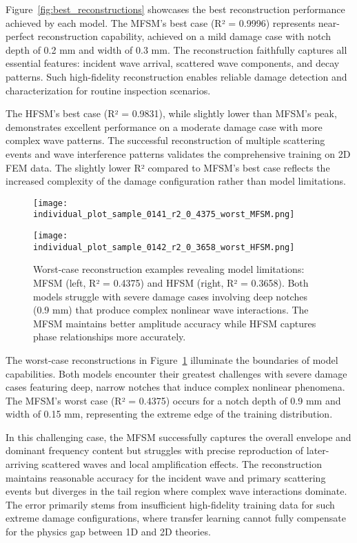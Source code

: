 \documentclass[12pt,a4paper]{report}
\begin{document}
Figure~\ref{fig:best_reconstructions} showcases the best reconstruction performance achieved by each model. The MFSM's best case (R² = 0.9996) represents near-perfect reconstruction capability, achieved on a mild damage case with notch depth of 0.2 mm and width of 0.3 mm. The reconstruction faithfully captures all essential features: incident wave arrival, scattered wave components, and decay patterns. Such high-fidelity reconstruction enables reliable damage detection and characterization for routine inspection scenarios.

The HFSM's best case (R² = 0.9831), while slightly lower than MFSM's peak, demonstrates excellent performance on a moderate damage case with more complex wave patterns. The successful reconstruction of multiple scattering events and wave interference patterns validates the comprehensive training on 2D FEM data. The slightly lower R² compared to MFSM's best case reflects the increased complexity of the damage configuration rather than model limitations.

\begin{figure}[htbp]
\centering
\begin{minipage}{0.49\textwidth}
\centering
\texttt{[image: individual\_plot\_sample\_0141\_r2\_0\_4375\_worst\_MFSM.png]}
\end{minipage}
\hfill
\begin{minipage}{0.49\textwidth}
\centering
\texttt{[image: individual\_plot\_sample\_0142\_r2\_0\_3658\_worst\_HFSM.png]}
\end{minipage}
\caption{Worst-case reconstruction examples revealing model limitations: MFSM (left, R² = 0.4375) and HFSM (right, R² = 0.3658). Both models struggle with severe damage cases involving deep notches (0.9 mm) that produce complex nonlinear wave interactions. The MFSM maintains better amplitude accuracy while HFSM captures phase relationships more accurately.}
\label{fig:worst_reconstructions}
\end{figure}

The worst-case reconstructions in Figure~\ref{fig:worst_reconstructions} illuminate the boundaries of model capabilities. Both models encounter their greatest challenges with severe damage cases featuring deep, narrow notches that induce complex nonlinear phenomena. The MFSM's worst case (R² = 0.4375) occurs for a notch depth of 0.9 mm and width of 0.15 mm, representing the extreme edge of the training distribution.

In this challenging case, the MFSM successfully captures the overall envelope and dominant frequency content but struggles with precise reproduction of later-arriving scattered waves and local amplification effects. The reconstruction maintains reasonable accuracy for the incident wave and primary scattering events but diverges in the tail region where complex wave interactions dominate. The error primarily stems from insufficient high-fidelity training data for such extreme damage configurations, where transfer learning cannot fully compensate for the physics gap between 1D and 2D theories.
\end{document}
